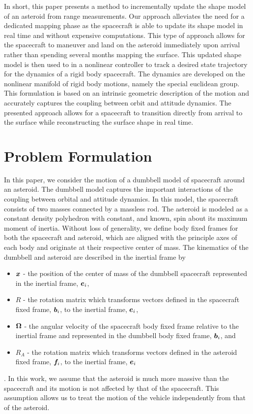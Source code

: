 \documentclass[letterpaper, paper,11pt]{AAS}		%
\begin{document}
In short, this paper presents a method to incrementally update the shape  model of an asteroid from range measurements. 
Our approach alleviates the need for a dedicated mapping phase as the spacecraft is able to update its shape model in real time and without expensive computations.
This type of approach allows for the spacecraft to maneuver and land on the asteroid immediately upon arrival rather than spending several months mapping the surface.
This updated shape model is then used to in a nonlinear controller to track a desired state trajectory for the dynamics of a rigid body spacecraft.
The dynamics are developed on the nonlinear manifold of rigid body motions, namely the special euclidean group.
This formulation is based on an intrinsic geometric description of the motion and accurately captures the coupling between orbit and attitude dynamics. 
The presented approach allows for a spacecraft to transition directly from arrival to the surface while reconstructing the surface shape in real time.


\section{Problem Formulation}\label{sec:problem}

In this paper, we consider the motion of a dumbbell model of spacecraft around an asteroid.
The dumbbell model captures the important interactions of the coupling between orbital and attitude dynamics.
In this model, the spacecraft consists of two masses connected by a massless rod.
The asteroid is modeled as a constant density polyhedron with constant, and known, spin about its maximum moment of inertia. 
Without loss of generality, we define body fixed frames for both the spacecraft and asteroid, which are aligned with the principle axes of each body and originate at their respective center of mass. 
The kinematics of the dumbbell and asteroid are described in the inertial frame by
\begin{itemize}
    \item \( \bm{x} \) - the position of the center of mass of the dumbbell spacecraft represented in the inertial frame, \( \bm{e}_i\),
    \item \( R \) - the rotation matrix which transforms vectors defined in the spacecraft fixed frame, \( \bm{b}_i \), to the inertial frame, \( \bm{e}_i \),
    \item \( \bm{\Omega} \) - the angular velocity of the spacecraft body fixed frame relative to the inertial frame and represented in the dumbbell body fixed frame, \( \bm{b}_i \), and
    \item \( R_A \) - the rotation matrix which transforms vectors defined in the asteroid fixed frame, \( \bm{f}_i \), to the inertial frame, \( \bm{e}_i \)
\end{itemize}.
In this work, we assume that the asteroid is much more massive than the spacecraft and its motion is not affected by that of the spacecraft.
This assumption allows us to treat the motion of the vehicle independently from that of the asteroid. 
\end{document}
